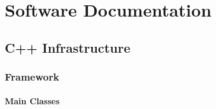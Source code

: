 \section{Software Documentation}

\subsection{C++ Infrastructure}\label{Sec:CodeDocs}

\subsubsection{Framework}

\paragraph{Main Classes}

